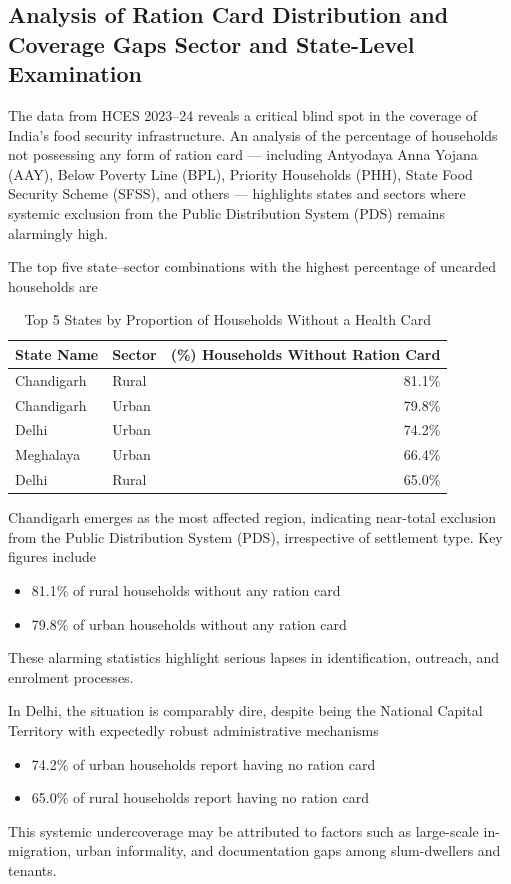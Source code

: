 \documentclass{article}
\begin{document}
\newpage
\subsection{Analysis of Ration Card Distribution and Coverage Gaps Sector and State-Level Examination}
The data from HCES 2023–24 reveals a critical blind spot in the coverage of India’s food security infrastructure. An analysis of the percentage of households not possessing any form of ration card — including Antyodaya Anna Yojana (AAY), Below Poverty Line (BPL), Priority Households (PHH), State Food Security Scheme (SFSS), and others — highlights states and sectors where systemic exclusion from the Public Distribution System (PDS) remains alarmingly high.

The top five state–sector combinations with the highest percentage of uncarded households are

\begin{table}[htbp]
	\centering
	\caption{Top 5 States by Proportion of Households Without a Health Card}
	\begin{tabular}{llr}
		\toprule
		\textbf{State Name} & \textbf{Sector} & \textbf{(\%) Households Without Ration Card
			} \\
		\midrule
		Chandigarh & Rural & 81.1\% \\
		Chandigarh & Urban & 79.8\% \\
		Delhi      & Urban & 74.2\% \\
		Meghalaya  & Urban & 66.4\% \\
		Delhi      & Rural & 65.0\% \\
		\bottomrule
	\end{tabular}
\end{table}

Chandigarh emerges as the most affected region, indicating near-total exclusion from the Public Distribution System (PDS), irrespective of settlement type. Key figures include
\begin{itemize}
	\item 81.1\% of rural households without any ration card
	\item 79.8\% of urban households without any ration card
\end{itemize}
These alarming statistics highlight serious lapses in identification, outreach, and enrolment processes.

In Delhi, the situation is comparably dire, despite being the National Capital Territory with expectedly robust administrative mechanisms
\begin{itemize}
	\item 74.2\% of urban households report having no ration card
	\item 65.0\% of rural households report having no ration card
\end{itemize}
This systemic undercoverage may be attributed to factors such as large-scale in-migration, urban informality, and documentation gaps among slum-dwellers and tenants.
\end{document}
